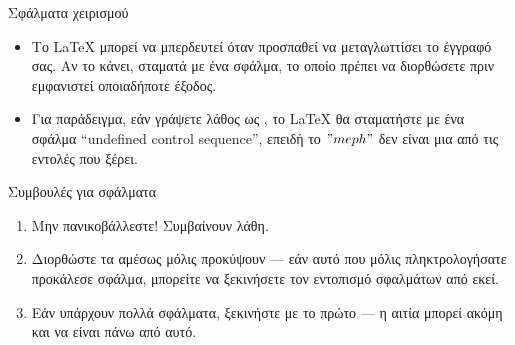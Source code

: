 \documentclass{beamer}
\begin{document}
\gr
\begin{frame}[fragile]{Σφάλματα χειρισμού}
\begin{itemize}
\item Το \LaTeX{} μπορεί να μπερδευτεί όταν προσπαθεί να μεταγλωττίσει το έγγραφό σας. Αν
το κάνει, σταματά με ένα σφάλμα, το οποίο πρέπει να διορθώσετε πριν εμφανιστεί
οποιαδήποτε έξοδος.
\item Για παράδειγμα, εάν γράψετε λάθος \en {} \gr ως \en {} \gr, το \LaTeX{} θα
σταματήστε με ένα σφάλμα \en ``undefined control sequence''\gr, επειδή το $"meph"$ δεν είναι
μια από τις εντολές που ξέρει.
\end{itemize}
\begin{block}{Συμβουλές για σφάλματα}
\begin{enumerate}
\item Μην πανικοβάλλεστε! Συμβαίνουν λάθη.
\item Διορθώστε τα αμέσως μόλις προκύψουν --- εάν αυτό που μόλις πληκτρολογήσατε προκάλεσε σφάλμα,
μπορείτε να ξεκινήσετε τον εντοπισμό σφαλμάτων από εκεί.
\item Εάν υπάρχουν πολλά σφάλματα, ξεκινήστε με το πρώτο --- η αιτία μπορεί
ακόμη και να είναι πάνω από αυτό.
\end{enumerate}
\end{block}
\end{frame}

\end{document}
